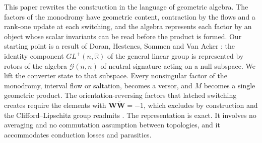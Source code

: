 \documentclass[journal]{IEEEtran}
\newcommand{\Gnn}{\mathcal{G}(n,n)}
\newcommand{\rev}[1]{\widetilde{#1}}
\begin{document}
This paper rewrites the construction in the language of geometric algebra.
The factors of the monodromy have geometric content, contraction by the
flows and a rank-one update at each switching, and the algebra represents
each factor by an object whose scalar invariants can be read before the
product is formed. Our starting point is a result of Doran, Hestenes, Sommen
and Van Acker \cite{doran1993lie}: the identity component
$GL^{+}(n,\mathbb{R})$ of the general linear group is represented by rotors
of the algebra $\Gnn$ of neutral signature acting on a null subspace. We lift
the converter state to that subspace. Every nonsingular factor of the
monodromy, interval flow or saltation, becomes a versor, and $M$ becomes a
single geometric product. The orientation-reversing factors that latched
switching creates require the elements with $\bm{W}\rev{\bm{W}}=-1$, which
\cite{doran1993lie} excludes by construction and the Clifford--Lipschitz
group readmits \cite{lounesto2001}. The representation is exact. It involves
no averaging and no commutation assumption between topologies, and it
accommodates conduction losses and parasitics.
\end{document}
